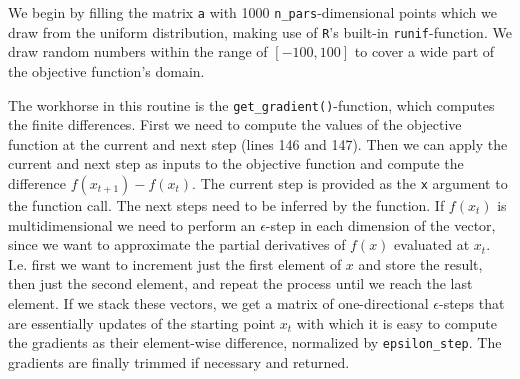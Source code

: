 \documentclass{article}
\begin{document}


We begin by filling the matrix \texttt{a} with 1000 \texttt{n\_pars}-dimensional points which we draw from the uniform distribution, making use of \texttt{R}'s built-in \texttt{runif}-function. We draw random numbers within the range of $[-100, 100]$ to cover a wide part of the objective function's domain.  



The workhorse in this routine is the \texttt{get\_gradient()}-function, which computes the finite differences. First we need to compute the values of the objective function at the current and next step (lines 146 and 147). Then we can apply the current and next step as inputs to the objective function and compute the difference $f(x_{t+1}) - f(x_t)$. The current step is provided as the \texttt{x} argument to the function call. The next steps need to be inferred by the function. If $f(x_t)$ is multidimensional we need to perform an $\epsilon$-step in each dimension of the vector, since we want to approximate the partial derivatives of $f(x)$ evaluated at $x_t$. I.e. first we want to increment just the first element of $x$ and store the result, then just the second element, and repeat the process until we reach the last element. If we stack these vectors, we get a matrix of one-directional $\epsilon$-steps that are essentially updates of the starting point $x_t$ with which it is easy to compute the gradients as their element-wise difference, normalized by \texttt{epsilon\_step}. The gradients are finally trimmed if necessary and returned.
\end{document}
